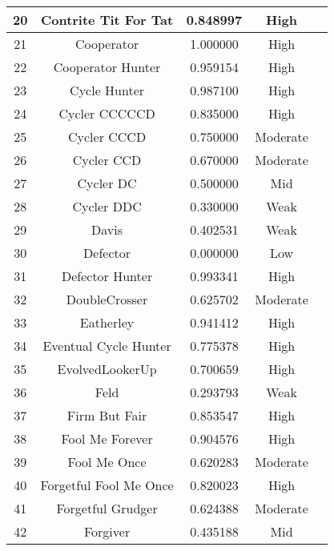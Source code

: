 \begin{longtable}{ccccc}
			20  & Contrite Tit For Tat        & 0.848997          & High     \\ \hline
			21  & Cooperator                  & 1.000000          & High     \\ \hline
			22  & Cooperator Hunter           & 0.959154          & High     \\ \hline
			23  & Cycle Hunter                & 0.987100          & High     \\ \hline
			24  & Cycler CCCCCD               & 0.835000          & High     \\ \hline
			25  & Cycler CCCD                 & 0.750000          & Moderate \\ \hline
			26  & Cycler CCD                  & 0.670000          & Moderate \\ \hline
			27  & Cycler DC                   & 0.500000          & Mid     \\ \hline
			28  & Cycler DDC                  & 0.330000          & Weak     \\ \hline
			29  & Davis                       & 0.402531          & Weak     \\ \hline
			30  & Defector                    & 0.000000          & Low      \\ \hline
			31  & Defector Hunter             & 0.993341          & High     \\ \hline
			32  & DoubleCrosser               & 0.625702          & Moderate \\ \hline
			33  & Eatherley                   & 0.941412          & High     \\ \hline
			34  & Eventual Cycle Hunter       & 0.775378          & High     \\ \hline
			35  & EvolvedLookerUp             & 0.700659          & High \\ \hline
			36  & Feld                        & 0.293793          & Weak     \\ \hline
			37  & Firm But Fair               & 0.853547          & High     \\ \hline
			38  & Fool Me Forever             & 0.904576          & High     \\ \hline
			39  & Fool Me Once                & 0.620283          & Moderate \\ \hline
			40  & Forgetful Fool Me Once      & 0.820023          & High     \\ \hline
			41  & Forgetful Grudger           & 0.624388          & Moderate \\ \hline
			42  & Forgiver                    & 0.435188          & Mid     \\ \hline

\end{longtable}
